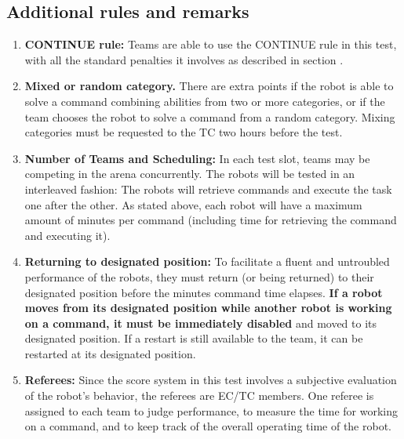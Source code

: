 \subsection{Additional rules and remarks}
\label{sec:eegpsr-remarks}
\begin{enumerate}
	\item \textbf{CONTINUE rule:} Teams are able to use the CONTINUE rule in this test, with all the standard penalties it involves as described in section .
	\\

	\item \textbf{Mixed or random category.} There are extra points if the robot is able to solve a command combining abilities from two or more categories, or if the team chooses the robot to solve a command from a random category. Mixing categories must be requested to the TC two hours before the test.\\

	\item \textbf{Number of Teams and Scheduling:} In each test slot, \eegpsrTeams teams may be competing in the arena concurrently. The robots will be tested in an interleaved fashion: The robots will retrieve commands and execute the task one after the other. As stated above, each robot will have a maximum amount of \eegpsrMaxCmdTime minutes per command (including time for retrieving the command and executing it). \\
	
	\item \textbf{Returning to designated position:} To facilitate a fluent and untroubled performance of the robots, they must return (or being returned) to their designated position before the \eegpsrMaxCmdTime minutes command time elapses. \textbf{If a robot moves from its designated position while another robot is working on a command, it must be immediately disabled} and moved to its designated position. If a restart is still available to the team, it can be restarted at its designated position. \\

	\item \textbf{Referees:} Since the score system in this test involves a subjective evaluation of the robot's behavior, the referees are EC/TC members. One referee is assigned to each team to judge performance, to measure the time for working on a command, and to keep track of the overall operating time of the robot. \\


\end{enumerate}
